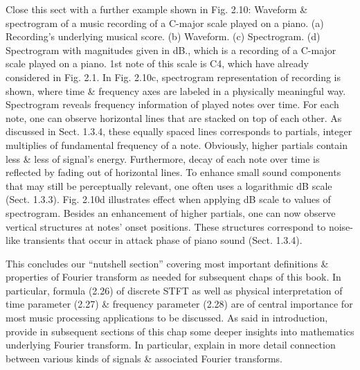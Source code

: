 \documentclass{article}
\begin{document}
\begin{itemize}
\begin{itemize}
\begin{itemize}
			Close this sect with a further example shown in {\sf Fig. 2.10: Waveform \& spectrogram of a music recording of a C-major scale played on a piano. (a) Recording's underlying musical score. (b) Waveform. (c) Spectrogram. (d) Spectrogram with magnitudes given in dB.}, which is a recording of a C-major scale played on a piano. 1st note of this scale is C4, which have already considered in {\sf Fig. 2.1}. In {\sf Fig. 2.10c}, spectrogram representation of recording is shown, where time \& frequency axes are labeled in a physically meaningful way. Spectrogram reveals frequency information of played notes over time. For each note, one can observe horizontal lines that are stacked on top of each other. As discussed in Sect. 1.3.4, these equally spaced lines corresponds to partials, integer multiplies of fundamental frequency of a note. Obviously, higher partials contain less \& less of signal's energy. Furthermore, decay of each note over time is reflected by fading out of horizontal lines. To enhance small sound components that may still be perceptually relevant, one often uses a logarithmic dB scale (Sect. 1.3.3). {\sf Fig. 2.10d} illustrates effect when applying dB scale to values of spectrogram. Besides an enhancement of higher partials, one can now observe vertical structures at notes' onset positions. These structures correspond to noise-like transients that occur in attack phase of piano sound (Sect. 1.3.4).
			
			This concludes our ``nutshell section'' covering most important definitions \& properties of Fourier transform as needed for subsequent chaps of this book. In particular, formula (2.26) of discrete STFT as well as physical interpretation of time parameter (2.27) \& frequency parameter (2.28) are of central importance for most music processing applications to be discussed. As said in introduction, provide in subsequent sections of this chap some deeper insights into mathematics underlying Fourier transform. In particular, explain in more detail connection between various kinds of signals \& associated Fourier transforms.
			

\end{itemize}
\end{itemize}
\end{itemize}
\end{document}
